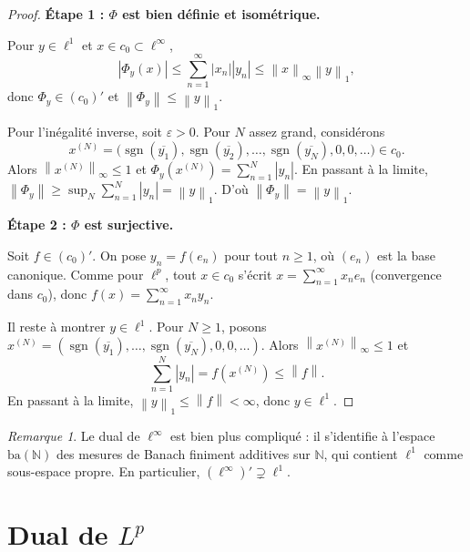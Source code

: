 \documentclass[a4paper,12pt]{book}
\DeclareMathOperator{\sgn}{sgn}
\newcommand{\N}{\mathbb{N}}
\newcommand{\norm}[1]{\left\| #1 \right\|}
\newcommand{\abs}[1]{\left| #1 \right|}
\theoremstyle{definition}
\theoremstyle{plain}
\theoremstyle{remark}
\newtheorem{remarque}[definition]{Remarque}
\begin{document}
\begin{proof}
\noindent\textbf{Étape 1 : $\Phi$ est bien définie et isométrique.}

Pour $y \in \ell^1$ et $x \in c_0 \subset \ell^\infty$,
\[
  \abs{\Phi_y(x)} \le \sum_{n=1}^{\infty} \abs{x_n}\abs{y_n}
  \le \norm{x}_\infty \norm{y}_1,
\]
donc $\Phi_y \in (c_0)'$ et $\norm{\Phi_y} \le \norm{y}_1$.

Pour l'inégalité inverse, soit $\varepsilon > 0$. Pour $N$ assez grand, considérons
\[
  x^{(N)} = \bigl(\sgn(\overline{y_1}), \sgn(\overline{y_2}), \ldots, \sgn(\overline{y_N}), 0, 0, \ldots\bigr) \in c_0.
\]
Alors $\norm{x^{(N)}}_\infty \le 1$ et
$\Phi_y(x^{(N)}) = \sum_{n=1}^N \abs{y_n}$.
En passant à la limite,
$\norm{\Phi_y} \ge \sup_N \sum_{n=1}^N \abs{y_n} = \norm{y}_1$.
D'où $\norm{\Phi_y} = \norm{y}_1$.

\medskip
\noindent\textbf{Étape 2 : $\Phi$ est surjective.}

Soit $f \in (c_0)'$. On pose $y_n = f(e_n)$ pour tout $n \ge 1$, où $(e_n)$ est la
base canonique. Comme pour $\ell^p$, tout $x \in c_0$ s'écrit
$x = \sum_{n=1}^{\infty} x_n e_n$ (convergence dans $c_0$), donc
$f(x) = \sum_{n=1}^{\infty} x_n y_n$.

Il reste à montrer $y \in \ell^1$. Pour $N \ge 1$, posons
$x^{(N)} = (\sgn(\overline{y_1}), \ldots, \sgn(\overline{y_N}), 0, 0, \ldots)$.
Alors $\norm{x^{(N)}}_\infty \le 1$ et
\[
  \sum_{n=1}^N \abs{y_n} = f(x^{(N)}) \le \norm{f}.
\]
En passant à la limite, $\norm{y}_1 \le \norm{f} < \infty$, donc $y \in \ell^1$.
\end{proof}

\begin{remarque}
\label{rem:dual-linfty}
Le dual de $\ell^\infty$ est bien plus compliqué : il s'identifie à l'espace
$\mathrm{ba}(\N)$\index{ba(N)@$\mathrm{ba}(\N)$} des mesures de Banach
finiment additives sur $\N$, qui contient $\ell^1$ comme sous-espace propre.
En particulier, $(\ell^\infty)' \supsetneq \ell^1$.
\end{remarque}


\section{Dual de $L^p$}
\label{sec:dual-Lp}
\end{document}
